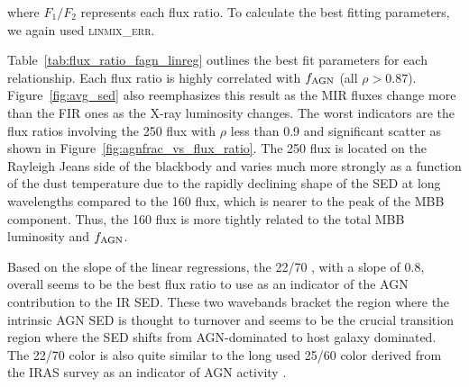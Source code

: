 \documentclass[fleqn, usenatbib]{mnras}
\begin{document}
\noindent where $F_{1}/F_{2}$ represents each flux ratio. To calculate the best fitting parameters, we again used \textsc{linmix\_err}. 

Table~\ref{tab:flux_ratio_fagn_linreg} outlines the best fit parameters for each relationship. Each flux ratio is highly correlated with $f_{\rm AGN}$ (all $\rho > 0.87$). Figure~\ref{fig:avg_sed} also reemphasizes this result as the MIR fluxes change more than the FIR ones as the X-ray luminosity changes. The worst indicators are the flux ratios involving the 250 \micron{} flux with $\rho$ less than 0.9 and significant scatter as shown in Figure~\ref{fig:agnfrac_vs_flux_ratio}. The 250 \micron{} flux is located on the Rayleigh Jeans side of the blackbody and varies much more strongly as a function of the dust temperature due to the rapidly declining shape of the SED at long wavelengths compared to the 160 \micron{} flux, which is nearer to the peak of the MBB component. Thus, the 160 \micron{} flux is more tightly related to the total MBB luminosity and $f_{\rm AGN}$.

Based on the slope of the linear regressions, the 22/70 \micron{}, with a slope of 0.8, overall seems to be the best flux ratio to use as an indicator of the AGN contribution to the IR SED. These two wavebands bracket the region where the intrinsic AGN SED is thought to turnover \citep[e.g.][]{Netzer:2007ve, Mullaney:2011yq} and seems to be the crucial transition region where the SED shifts from AGN-dominated to host galaxy dominated. The 22/70 \micron{} color is also quite similar to the long used 25/60 \micron{} color derived from the IRAS survey as an indicator of AGN activity \citep{de-Grijp:1985lr,de-Grijp:1987gb}. 

\end{document}

